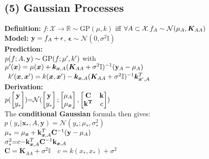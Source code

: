 \subsection*{(5) Gaussian Processes}
\textbf{Definition:} $f: \mathcal{X} \rightarrow \mathbb{R} \sim \mathrm{GP}(\mu, k)$ iff $\forall A \subset \mathcal{X}\!.\, f_A \sim \mathcal{N}(\mu_A, {\bm{K}}_{AA})$\\
\textbf{Model:} 
${\mathbf{y}} = f_A + \mathbf{\epsilon}$, $\mathbf{\epsilon} \sim \mathcal{N}(0, \sigma^2\mathbb{I})$\\
\textbf{Prediction:}\\
$p(f;A,{\mathbf{y}}) \sim \mathrm{GP}(f;\mu', k')$ with\\
\mbox{\hspace{-1em}$\mu'({\bm{x}}) = \mu({\bm{x}}) + {\bm{k}}_{{\bm{x}},A}({\bm{K}}_{AA} + \sigma^2\mathbb{I})^{-1}({\mathbf{y}}_A - \mu_A)$}\\
\mbox{\hspace{-2em}
$k'({\bm{x}},{\bm{x}}') = k({\bm{x}},{\bm{x}}') - {\bm{k}}_{{\bm{x}},A}({\bm{K}}_{AA}+\sigma^2\mathbb{I})^{-1}{\bm{k}}^T_{{\bm{x}}',A}$}\\
\textbf{Derivation:}\\
$p(\begin{bmatrix}
\mathbf{y}\\
y_*\\
\end{bmatrix}){=}\mathcal{N}(\begin{bmatrix}
    \mathbf{y}\\
    y_*\\
    \end{bmatrix};\begin{bmatrix}
        \mathbf{\mu}_A\\
        \mu_{\bm{x}}\\
        \end{bmatrix},\begin{bmatrix}
\mathbf{C} & \mathbf{k} \\
\mathbf{k^T} & c \\
\end{bmatrix})$\\
The \textbf{conditional Gaussian} formula then gives:
$p(y_*|\mathbf{x_*}, A, \mathbf{y}){=} \mathcal{N}(y_*;\mu_{*}, \sigma^2_{*})$\\
$\mu_{*} = \mu_{\bm{x}} + \mathbf{k}_{{\bm{x}},A}^T\mathbf{C}^{-1}(\mathbf{y}-\mu_A)$\\
$\sigma^2_{*}{=}c{-}\mathbf{k}_{{\bm{x}},A}^T\mathbf{C}^{-1}\mathbf{k}_{{\bm{x}},A}$\\
$\mathbf{C}=\mathbf{K}_{AA}+\sigma^2\mathbb{I} \quad c{=}k(x_*,x_*){+}\sigma^2$

